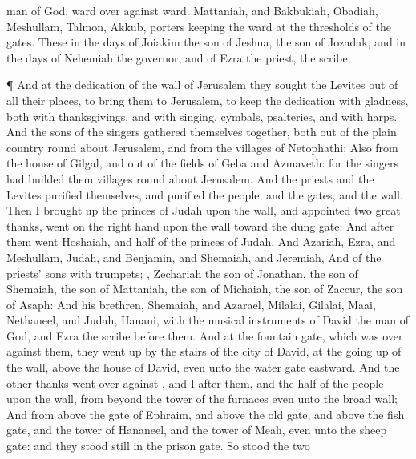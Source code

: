 {man of
God,
ward over
against
ward.
Mattaniah, and
Bakbukiah,
Obadiah,
Meshullam,
Talmon,
Akkub,
{}
porters
keeping the
ward at the
thresholds of the
gates.
These
{} in the
days of
Joiakim the
son of
Jeshua, the
son of
Jozadak, and in the
days of
Nehemiah the
governor, and of
Ezra the
priest, the
scribe.
\par }{\PP {}¶ And at the
dedication of the
wall of
Jerusalem they
sought the
Levites out of all their
places, to
bring them to
Jerusalem, to
keep the
dedication with
gladness, both with
thanksgivings, and with
singing,
{}
cymbals,
psalteries, and with
harps.
And the
sons of the
singers gathered themselves
together, both out of the plain
country round
about
Jerusalem, and from the
villages of
Netophathi;
Also from the
house of
Gilgal, and out of the
fields of
Geba and
Azmaveth: for the
singers had
builded them
villages round
about
Jerusalem.
And the
priests and the
Levites
purified themselves, and
purified the
people, and the
gates, and the
wall.
Then I brought
up the
princes of
Judah upon the
wall, and
appointed
two
great
{}
thanks,
{}
went on the right
hand upon the
wall toward the
dung
gate:
And
after them
went
Hoshaiah, and
half of the
princes of
Judah,
And
Azariah,
Ezra, and
Meshullam,
Judah, and
Benjamin, and
Shemaiah, and
Jeremiah,
And
{} of the
priests’
sons with
trumpets;
{},
Zechariah the
son of
Jonathan, the
son of
Shemaiah, the
son of
Mattaniah, the
son of
Michaiah, the
son of
Zaccur, the
son of
Asaph:
And his
brethren,
Shemaiah, and
Azarael,
Milalai,
Gilalai,
Maai,
Nethaneel, and
Judah,
Hanani, with the
musical
instruments of
David the
man of
God, and
Ezra the
scribe
before them.
And at the
fountain
gate, which was over against them, they went
up by the
stairs of the
city of
David, at the going
up of the
wall, above the
house of
David, even unto the
water
gate
eastward.
And the
other
{}
thanks
went over
against
{}, and I
after them, and the
half of the
people upon the
wall, from beyond the
tower of the
furnaces even unto the
broad
wall;
And from above the
gate of
Ephraim, and above the
old
gate, and above the
fish
gate, and the
tower of
Hananeel, and the
tower of
Meah, even unto the
sheep
gate: and they stood
still in the
prison
gate.
So
stood the
two
{}
}
